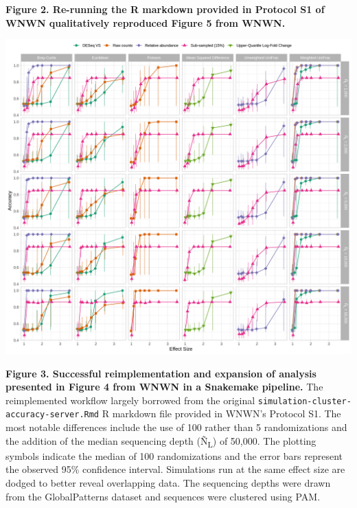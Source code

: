 \documentclass[
]{article}
\begin{document}
\textbf{Figure 2. Re-running the R markdown provided in Protocol S1 of
WNWN qualitatively reproduced Figure 5 from WNWN.}

\newpage

\includegraphics{figure_03.png}

\textbf{Figure 3. Successful reimplementation and expansion of analysis
presented in Figure 4 from WNWN in a Snakemake pipeline.} The
reimplemented workflow largely borrowed from the original
\texttt{simulation-cluster-accuracy-server.Rmd} R markdown file provided
in WNWN's Protocol S1. The most notable differences include the use of
100 rather than 5 randomizations and the addition of the median
sequencing depth (Ñ\textsubscript{L}) of 50,000. The plotting symbols
indicate the median of 100 randomizations and the error bars represent
the observed 95\% confidence interval. Simulations run at the same
effect size are dodged to better reveal overlapping data. The sequencing
depths were drawn from the GlobalPatterns dataset and sequences were
clustered using PAM.

\newpage
\end{document}

